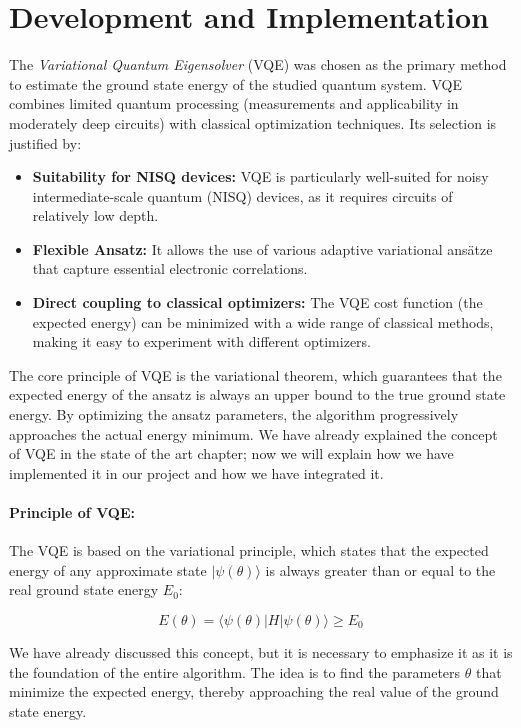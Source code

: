 \section{Development and Implementation}

The \textit{Variational Quantum Eigensolver} (VQE) was chosen as the primary method to estimate the ground state energy of the studied quantum system. VQE combines limited quantum processing (measurements and applicability in moderately deep circuits) with classical optimization techniques. Its selection is justified by:

\begin{itemize}
    \item \textbf{Suitability for NISQ devices:} VQE is particularly well-suited for noisy intermediate-scale quantum (NISQ) devices, as it requires circuits of relatively low depth.
    \item \textbf{Flexible Ansatz:} It allows the use of various adaptive variational ansätze that capture essential electronic correlations.
    \item \textbf{Direct coupling to classical optimizers:} The VQE cost function (the expected energy) can be minimized with a wide range of classical methods, making it easy to experiment with different optimizers.
\end{itemize}

The core principle of VQE is the variational theorem, which guarantees that the expected energy of the ansatz is always an upper bound to the true ground state energy. By optimizing the ansatz parameters, the algorithm progressively approaches the actual energy minimum. We have already explained the concept of VQE in the state of the art chapter; now we will explain how we have implemented it in our project and how we have integrated it.

\paragraph{Principle of VQE:}

The VQE is based on the variational principle, which states that the expected energy of any approximate state \( |\psi(\theta)\rangle \) is always greater than or equal to the real ground state energy \( E_0 \):

\[
E(\theta) = \langle \psi(\theta) | H | \psi(\theta) \rangle \geq E_0
\]

We have already discussed this concept, but it is necessary to emphasize it as it is the foundation of the entire algorithm. The idea is to find the parameters \( \theta \) that minimize the expected energy, thereby approaching the real value of the ground state energy.

